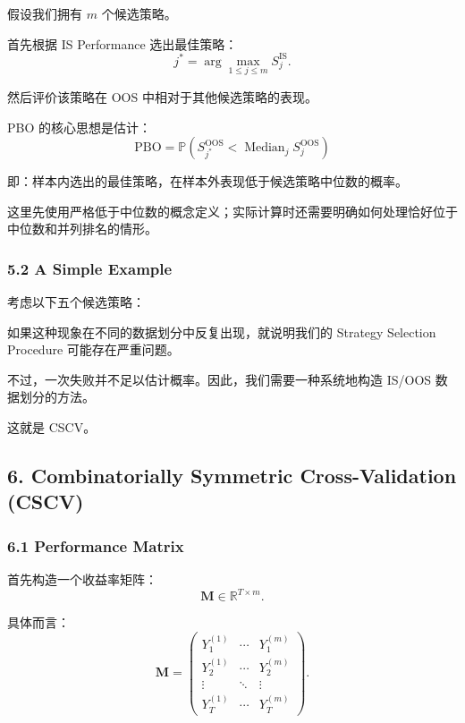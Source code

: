 假设我们拥有 \(m\) 个候选策略。

首先根据 IS Performance 选出最佳策略：
\[j^*
=
\arg\max_{1\leq j\leq m}
S_j^{\mathrm{IS}}.\]

然后评价该策略在 OOS 中相对于其他候选策略的表现。

PBO 的核心思想是估计：
\[\boxed{
\mathrm{PBO}
=
\mathbb P\left(
S_{j^*}^{\mathrm{OOS}}
<
\operatorname{Median}_{j}
S_j^{\mathrm{OOS}}
\right)
}\]

即：样本内选出的最佳策略，在样本外表现低于候选策略中位数的概率。

这里先使用严格低于中位数的概念定义；实际计算时还需要明确如何处理恰好位于中位数和并列排名的情形。

\hypertarget{part-4-71-0001-a-simple-example}{%
\subsubsection{5.2 A Simple Example}\label{part-4-71-0001-a-simple-example}}

考虑以下五个候选策略：


如果这种现象在不同的数据划分中反复出现，就说明我们的 Strategy Selection Procedure 可能存在严重问题。

不过，一次失败并不足以估计概率。因此，我们需要一种系统地构造 IS/OOS 数据划分的方法。

这就是 CSCV。

\hypertarget{part-4-71-0001-combinatorially-symmetric-cross-validation-cscv}{%
\subsection{6. Combinatorially Symmetric Cross-Validation (CSCV)}\label{part-4-71-0001-combinatorially-symmetric-cross-validation-cscv}}

\hypertarget{part-4-71-0001-performance-matrix}{%
\subsubsection{6.1 Performance Matrix}\label{part-4-71-0001-performance-matrix}}

首先构造一个收益率矩阵：
\[\mathbf M\in\mathbb R^{T\times m}.\]

具体而言：
\[\mathbf M=
\begin{pmatrix}
Y_1^{(1)} & \cdots & Y_1^{(m)}\\
Y_2^{(1)} & \cdots & Y_2^{(m)}\\
\vdots & \ddots & \vdots\\
Y_T^{(1)} & \cdots & Y_T^{(m)}
\end{pmatrix}.\]


